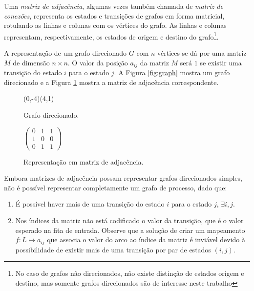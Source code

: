 \documentclass[12pt,a4paper]{article}
\let\vState=\origState
\begin{document}
Uma \textit{matriz de adjacência}, algumas vezes também chamada de 
\textit{matriz de conexões}, representa os estados e transições de grafos
em forma matricial, rotulando as linhas e colunas com os vértices do grafo.
As linhas e colunas representam, respectivamente, os estados de origem e destino
do grafo\footnote{No caso de grafos não direcionados, não existe
distinção de estados origem e destino, mas somente grafos direcionados são 
de interesse neste trabalho}.

A representação de um grafo direcionado $G$ com $n$ vértices se dá por uma
matriz $M$ de dimensão $n \times n$. O valor da posição $a_{ij}$ da matriz
$M$ será $1$ se existir uma transição do estado $i$ para o estado $j$.
A Figura \ref{fig:graph} mostra um grafo direcionado e a Figura \ref{fig:adjm}
mostra a matriz de adjacência correspondente.

\begin{figure}[ht]
\begin{minipage}[b]{0.5\linewidth}
\begin{center}
\begin{VCPicture}{(0,-4)(4,1)}
\vState[1]{(0,0)}{A} \vState[2]{(4,0)}{B}
\vState[3]{(2,-2)}{C}
  
 
\end{VCPicture}
\caption{Grafo direcionado.}
\label{fig:graph}
\end{center}
\end{minipage}
\hspace{0.5cm}
\begin{minipage}[b]{0.5\linewidth}
\begin{center}
\begin{math}
\begin{pmatrix}
0 & 1 & 1 \\
1 & 0 & 0 \\
0 & 1 & 1
\end{pmatrix}
\end{math}
\caption{Representação em matriz de adjacência.}
\label{fig:adjm}
\end{center}
\end{minipage}
\end{figure}

Embora matrizes de adjacência possam representar grafos direcionados simples,
não é possível representar completamente um grafo de processo, dado que:

\begin{enumerate}
\item É possível haver mais de uma transição do estado $i$ para o estado
$j$, $\exists i,j$.

\item Nos índices da matriz não está codificado o valor da transição, que
é o valor esperado na fita de entrada. Observe que a solução de criar
um mapeamento $f: L \mapsto a_{ij}$ que associa o valor do arco ao índice
da matriz é inviável devido à possibilidade de existir mais de uma
transição por par de estados $(i,j)$.
\end{enumerate}
\end{document}
